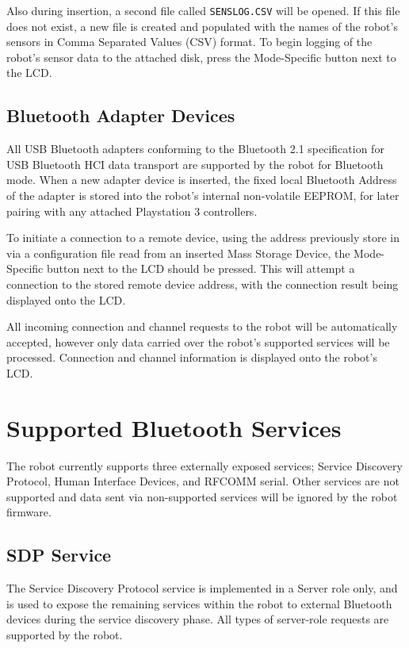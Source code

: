 Also during insertion, a second file called \texttt{SENSLOG.CSV} will be opened. If this file does not exist, a new file is created and populated with the names of the robot's sensors in Comma Separated Values (CSV) format. To begin logging of the robot's sensor data to the attached disk, press the Mode-Specific button next to the LCD.

\subsection{Bluetooth Adapter Devices}

All USB Bluetooth adapters conforming to the Bluetooth 2.1 specification for USB Bluetooth HCI data transport are supported by the robot for Bluetooth mode. When a new adapter device is inserted, the fixed local Bluetooth Address of the adapter is stored into the robot's internal non-volatile EEPROM, for later pairing with any attached Playstation 3 controllers.

To initiate a connection to a remote device, using the address previously store in via a configuration file read from an inserted Mass Storage Device, the Mode-Specific button next to the LCD should be pressed. This will attempt a connection to the stored remote device address, with the connection result being displayed onto the LCD.

All incoming connection and channel requests to the robot will be automatically accepted, however only data carried over the robot's supported services will be processed. Connection and channel information is displayed onto the robot's LCD.

\section{Supported Bluetooth Services}

The robot currently supports three externally exposed services; Service Discovery Protocol, Human Interface Devices, and RFCOMM serial. Other services are not supported and data sent via non-supported services will be ignored by the robot firmware.

\subsection{SDP Service}

The Service Discovery Protocol service is implemented in a Server role only, and is used to expose the remaining services within the robot to external Bluetooth devices during the service discovery phase. All types of server-role requests are supported by the robot.

